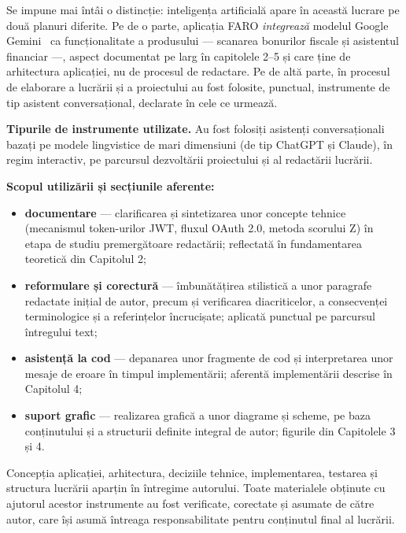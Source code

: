 \documentclass[12pt,a4paper,oneside]{report}
\begin{document}
Se impune mai întâi o distincție: inteligența artificială apare în această lucrare pe două planuri diferite. Pe de o parte, aplicația FARO \emph{integrează} modelul Google Gemini~\cite{ref:gemini} ca funcționalitate a produsului --- scanarea bonurilor fiscale și asistentul financiar ---, aspect documentat pe larg în capitolele 2--5 și care ține de arhitectura aplicației, nu de procesul de redactare. Pe de altă parte, în procesul de elaborare a lucrării și a proiectului au fost folosite, punctual, instrumente de tip asistent conversațional, declarate în cele ce urmează.

\textbf{Tipurile de instrumente utilizate.} Au fost folosiți asistenți conversaționali bazați pe modele lingvistice de mari dimensiuni (de tip ChatGPT și Claude), în regim interactiv, pe parcursul dezvoltării proiectului și al redactării lucrării.

\textbf{Scopul utilizării și secțiunile aferente:}
\begin{itemize}[leftmargin=2cm,itemsep=4pt]
  \item \textbf{documentare} --- clarificarea și sintetizarea unor concepte tehnice (mecanismul token-urilor JWT, fluxul OAuth 2.0, metoda scorului Z) în etapa de studiu premergătoare redactării; reflectată în fundamentarea teoretică din Capitolul 2;
  \item \textbf{reformulare și corectură} --- îmbunătățirea stilistică a unor paragrafe redactate inițial de autor, precum și verificarea diacriticelor, a consecvenței terminologice și a referințelor încrucișate; aplicată punctual pe parcursul întregului text;
  \item \textbf{asistență la cod} --- depanarea unor fragmente de cod și interpretarea unor mesaje de eroare în timpul implementării; aferentă implementării descrise în Capitolul 4;
  \item \textbf{suport grafic} --- realizarea grafică a unor diagrame și scheme, pe baza conținutului și a structurii definite integral de autor; figurile din Capitolele 3 și 4.
\end{itemize}

Concepția aplicației, arhitectura, deciziile tehnice, implementarea, testarea și structura lucrării aparțin în întregime autorului. Toate materialele obținute cu ajutorul acestor instrumente au fost verificate, corectate și asumate de către autor, care își asumă întreaga responsabilitate pentru conținutul final al lucrării.

\end{document}
